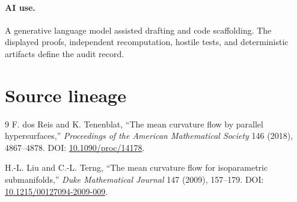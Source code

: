 \documentclass[10pt]{article}
\begin{document}
\paragraph{AI use.}
A generative language model assisted drafting and code scaffolding.  The
displayed proofs, independent recomputation, hostile tests, and deterministic
artifacts define the audit record.
\fi

\section*{Source lineage}
\begin{thebibliography}{9}
F. dos Reis and K. Tenenblat,
``The mean curvature flow by parallel hypersurfaces,''
\emph{Proceedings of the American Mathematical Society} 146 (2018),
4867--4878. DOI:
\href{https://doi.org/10.1090/proc/14178}{10.1090/proc/14178}.

H.-L. Liu and C.-L. Terng,
``The mean curvature flow for isoparametric submanifolds,''
\emph{Duke Mathematical Journal} 147 (2009), 157--179. DOI:
\href{https://doi.org/10.1215/00127094-2009-009}%
{10.1215/00127094-2009-009}.
\end{thebibliography}
\end{document}
